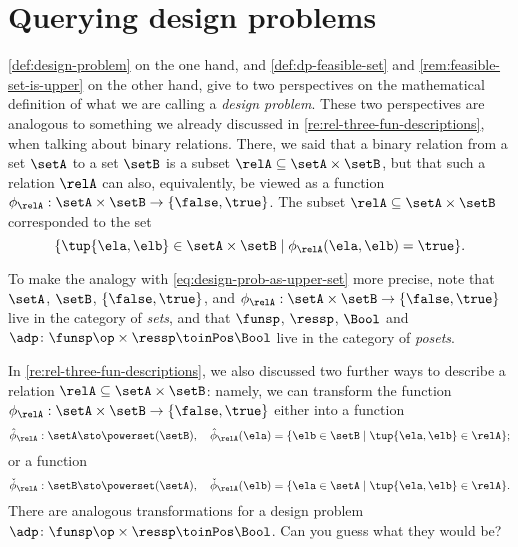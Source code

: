 
\section{Querying design problems}
\label{sec:dp-querying}



\cref{def:design-problem} on the one hand, and \cref{def:dp-feasible-set} and \cref{rem:feasible-set-is-upper} on the other hand, give to two perspectives on the mathematical definition of what we are calling a \emph{design problem}. These two perspectives are analogous to something we already discussed in \cref{re:rel-three-fun-descriptions}, when talking about binary relations. There, we said that a binary relation from a set $\setA$ to a set $\setB$ is a subset $\relA \subseteq \setA \times \setB$, but that such a relation $\relA$ can also, equivalently, be viewed as a function $\phi_{\relA}: \setA \times \setB \to \{ \false, \true \}$. The subset $\relA \subseteq \setA \times \setB$ corresponded to the set
\begin{equation}
\{ \tup{\ela, \elb} \in \setA \times \setB \mid \phi_{\relA}(\ela, \elb) = \true \}.
\end{equation}

To make the analogy with \cref{eq:design-prob-as-upper-set} more precise, note that $\setA$, $\setB$, $\{ \false, \true \}$, and $\phi_{\relA}: \setA \times \setB \to \{ \false, \true \}$ live in the category of \emph{sets}, and that $\funsp$,  $\ressp$, $\Bool$ and $\adp\colon \funsp\op \times \ressp\toinPos \Bool$ live in the category of \emph{posets}. 

In \cref{re:rel-three-fun-descriptions}, we also discussed two further ways to describe a relation $\relA \subseteq \setA \times \setB$: namely, we can transform the function $\phi_{\relA}: \setA \times \setB \to \{ \false, \true \}$ either into a function 
\begin{equation}\label{eq:curried-relation-again}
\hat \phi_{\relA} : \setA \sto \powerset (\setB), \quad \hat \phi_{\relA} (\ela) = \{ \elb \in \setB \mid \tup{\ela, \elb} \in \relA \};
\end{equation}
or a function 
\begin{equation}\label{eq:co-curried-relation-again}
\check \phi_{\relA} : \setB \sto \powerset (\setA), \quad \check \phi_{\relA} (\elb) = \{ \ela \in \setA \mid \tup{\ela, \elb} \in \relA \}. 
\end{equation}
There are analogous transformations for a design problem $\adp\colon \funsp\op \times \ressp\toinPos \Bool$. Can you guess what they would be?

